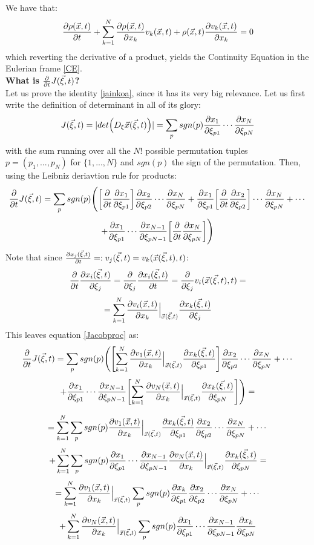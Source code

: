 \documentclass[11pt, a4paper]{article} %
\DeclareRobustCommand{\mybox}[2][gray!10]{%
\begin{tcolorbox}[   %
        left=0.2cm,
        right=0.2cm,
        top=0.15cm,
        bottom=0.15cm,
        colback=#1,
        colframe=#1,
        width=\dimexpr\textwidth\relax, 
        enlarge left by=0mm,
        boxsep=5pt,
        arc=0pt,outer arc=0pt,
        ]
        #2
\end{tcolorbox}
}
\begin{document}
\mybox{
We have that:
\begin{equation}
\pdv{\rho(\vec{x},t)}{t}+\sum_{k=1}^N\pdv{\rho(\vec{x},t)}{x_k}v_k(\vec{x},t)+\rho(\vec{x},t)\pdv{v_k(\vec{x},t)}{x_k}=0
\end{equation}
which reverting the derivative of a product, yields the Continuity Equation in the Eulerian frame \eqref{CE}.\\

{\bf What is $\pdv{}{t}J(\vec{\xi},t)$?\vspace{0.2cm}\\}
Let us prove the identity \eqref{jainkoa}, since it has its very big relevance. Let us first write the definition of determinant in all of its glory:
\begin{equation}
J(\vec{\xi},t)=|det \Big( D_\xi \vec{x}(\vec{\xi},t) \Big)|=\sum_p sgn(p) \pdv{x_1}{\xi_{p1}} \cdots \pdv{x_N}{\xi_{pN}}
\end{equation}
with the sum running over all the $N!$ possible permutation tuples $p=(p_1,...,p_N)$ for $\{1,...,N\}$ and $sgn(p)$ the sign of the permutation. Then, using the Leibniz deriavtion rule for products:
\begin{equation}\label{Jacobproc}
\pdv{}{t}J(\vec{\xi},t)=\sum_p sgn(p) \Bigg(\qty[\pdv{}{t}\pdv{x_1}{\xi_{p1}}]\pdv{x_2}{\xi_{p2}} \cdots \pdv{x_N}{\xi_{pN}}+\pdv{x_1}{\xi_{p1}}\qty[\pdv{}{t}\pdv{x_2}{\xi_{p2}}] \cdots \pdv{x_N}{\xi_{pN}}+\cdots
\end{equation}
$$
+\pdv{x_1}{\xi_{p1}} \cdots \pdv{x_{N-1}}{\xi_{pN-1}}\qty[\pdv{}{t}\pdv{x_N}{\xi_{pN}}]\Bigg)
$$
Note that since $\pdv{x_j(\vec{\xi},t)}{t}=:v_j(\vec{\xi},t)=v_k(\vec{x}(\vec{\xi},t),t)$:
\begin{equation}
\pdv{}{t}\pdv{x_i(\vec{\xi},t)}{\xi_j}=\pdv{}{\xi_j}\pdv{x_i(\vec{\xi},t)}{t}=\pdv{}{\xi_j}v_i(\vec{x}(\vec{\xi},t),t)=
\end{equation}
$$
=\sum_{k=1}^N \pdv{v_i(\vec{x},t)}{x_k}\Big\rvert_{\vec{x}(\vec{\xi},t)}\pdv{x_k(\vec{\xi},t)}{\xi_j}
$$
This leaves equation \eqref{Jacobproc} as:
\begin{equation}
\pdv{}{t}J(\vec{\xi},t)=\sum_p sgn(p) \Bigg(\qty[\sum_{k=1}^N \pdv{v_1(\vec{x},t)}{x_k}\Big\rvert_{\vec{x}(\vec{\xi},t)}\pdv{x_k(\vec{\xi},t)}{\xi_{p1}}]\pdv{x_2}{\xi_{p2}} \cdots \pdv{x_N}{\xi_{pN}}+\cdots
\end{equation}
$$
+\pdv{x_1}{\xi_{p1}} \cdots \pdv{x_{N-1}}{\xi_{pN-1}}\qty[\sum_{k=1}^N \pdv{v_N(\vec{x},t)}{x_k}\Big\rvert_{\vec{x}(\vec{\xi},t)}\pdv{x_k(\vec{\xi},t)}{\xi_{pN}}]\Bigg)=
$$

$$
=\sum_{k=1}^N\sum_p sgn(p) \pdv{v_1(\vec{x},t)}{x_k}\Big\rvert_{\vec{x}(\vec{\xi},t)}\pdv{x_k(\vec{\xi},t)}{\xi_{p1}}\pdv{x_2}{\xi_{p2}} \cdots \pdv{x_N}{\xi_{pN}}+\cdots 
$$
$$
+ \sum_{k=1}^N\sum_p sgn(p)\pdv{x_1}{\xi_{p1}} \cdots \pdv{x_{N-1}}{\xi_{pN-1}}\pdv{v_N(\vec{x},t)}{x_k}\Big\rvert_{\vec{x}(\vec{\xi},t)}\pdv{x_k(\vec{\xi},t)}{\xi_{pN}}=
$$
$$
=\sum_{k=1}^N \pdv{v_1(\vec{x},t)}{x_k}\Big\rvert_{\vec{x}(\vec{\xi},t)}\sum_p sgn(p)\pdv{x_k}{\xi_{p1}}\pdv{x_2}{\xi_{p2}} \cdots \pdv{x_N}{\xi_{pN}}+\cdots 
$$
$$
+ \sum_{k=1}^N\pdv{v_N(\vec{x},t)}{x_k}\Big\rvert_{\vec{x}(\vec{\xi},t)}\sum_p sgn(p)\pdv{x_1}{\xi_{p1}} \cdots \pdv{x_{N-1}}{\xi_{pN-1}}\pdv{x_k}{\xi_{pN}}
$$
}
\end{document}
